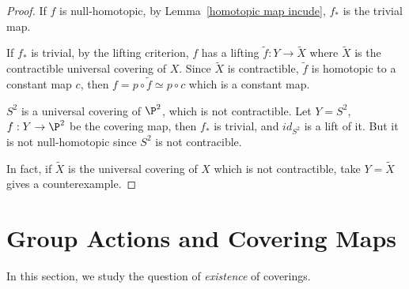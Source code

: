 \begin{proof}
If $f$ is null-homotopic, by Lemma~\ref{homotopic map incude}, $f_*$ is the trivial map.\par
If $f_*$ is trivial, by the lifting criterion, $f$ has a lifting $\widetilde{f}:Y\to\widetilde{X}$ where $\widetilde{X}$ is the contractible universal covering of $X$. Since $\widetilde{X}$ is contractible, $\widetilde{f}$ is homotopic to a constant map $c$, then $f=p\circ\widetilde{f}\simeq p\circ c$ which is a constant map.\par
$S^2$ is a universal covering of $\P^2$, which is not contractible. Let $Y=S^2$, $f:Y\to\P^2$ be the covering map, then $f_*$ is trivial, and $id_{S^2}$ is a lift of it. But it is not null-homotopic since $S^2$ is not contracible.\par
In fact, if $\widetilde{X}$ is the universal covering of $X$ which is not contractible, take $Y=\widetilde{X}$ gives a counterexample.
\end{proof}
\section{Group Actions and Covering Maps}
In this section, we study the question of \textit{existence} of coverings.\par
